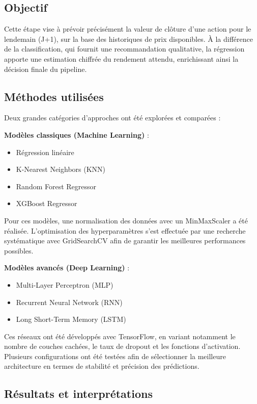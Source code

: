 \documentclass[a4paper,12pt]{article}
\begin{document}
\subsection*{Objectif}

Cette étape vise à prévoir précisément la valeur de clôture d'une action pour le lendemain (J+1), sur la base des historiques de prix disponibles. À la différence de la classification, qui fournit une recommandation qualitative, la régression apporte une estimation chiffrée du rendement attendu, enrichissant ainsi la décision finale du pipeline.

\subsection*{Méthodes utilisées}

Deux grandes catégories d'approches ont été explorées et comparées :

\textbf{Modèles classiques (Machine Learning)} :
\begin{itemize}
    \item Régression linéaire
    \item K-Nearest Neighbors (KNN)
    \item Random Forest Regressor
    \item XGBoost Regressor
\end{itemize}

Pour ces modèles, une normalisation des données avec un MinMaxScaler a été réalisée. L'optimisation des hyperparamètres s'est effectuée par une recherche systématique avec GridSearchCV afin de garantir les meilleures performances possibles.

\textbf{Modèles avancés (Deep Learning)} :
\begin{itemize}
    \item Multi-Layer Perceptron (MLP)
    \item Recurrent Neural Network (RNN)
    \item Long Short-Term Memory (LSTM)
\end{itemize}

Ces réseaux ont été développés avec TensorFlow, en variant notamment le nombre de couches cachées, le taux de dropout et les fonctions d'activation. Plusieurs configurations ont été testées afin de sélectionner la meilleure architecture en termes de stabilité et précision des prédictions.

\subsection*{Résultats et interprétations}
\end{document}
